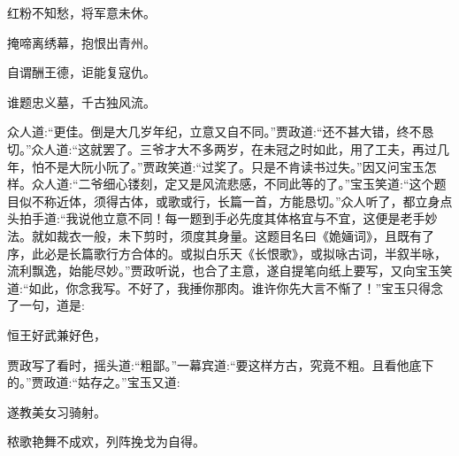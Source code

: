 \begin{poem}
    \begin{pl}红粉不知愁，将军意未休。\end{pl}

    \begin{pl}掩啼离绣幕，抱恨出青州。\end{pl}

    \begin{pl}自谓酬王德，讵能复寇仇。\end{pl}

    \begin{pl}谁题忠义墓，千古独风流。\end{pl}


\end{poem}


\begin{parag}
    众人道:“更佳。倒是大几岁年纪，立意又自不同。”贾政道:“还不甚大错，终不恳切。”众人道:“这就罢了。三爷才大不多两岁，在未冠之时如此，用了工夫，再过几年，怕不是大阮小阮了。”贾政笑道:“过奖了。只是不肯读书过失。”因又问宝玉怎样。众人道:“二爷细心镂刻，定又是风流悲感，不同此等的了。”宝玉笑道:“这个题目似不称近体，须得古体，或歌或行，长篇一首，方能恳切。”众人听了，都立身点头拍手道:“我说他立意不同！每一题到手必先度其体格宜与不宜，这便是老手妙法。就如裁衣一般，未下剪时，须度其身量。这题目名曰《姽婳词》，且既有了序，此必是长篇歌行方合体的。或拟白乐天《长恨歌》，或拟咏古词，半叙半咏，流利飘逸，始能尽妙。”贾政听说，也合了主意，遂自提笔向纸上要写，又向宝玉笑道:“如此，你念我写。不好了，我捶你那肉。谁许你先大言不惭了！”宝玉只得念了一句，道是:
\end{parag}


\begin{poem}
    \begin{pl}恒王好武兼好色，\end{pl}
\end{poem}


\begin{parag}
    贾政写了看时，摇头道:“粗鄙。”一幕宾道:“要这样方古，究竟不粗。且看他底下的。”贾政道:“姑存之。”宝玉又道:
\end{parag}


\begin{poem}
    \begin{pl}遂教美女习骑射。\end{pl}

    \begin{pl}秾歌艳舞不成欢，列阵挽戈为自得。\end{pl}


\end{poem}


